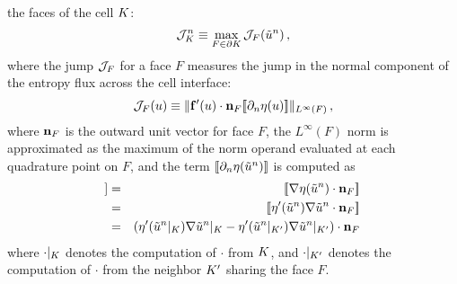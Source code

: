 the faces of the cell $K$:
\begin{equation}
  \mathcal{J}_K^n
  \equiv \max\limits_{F\in\partial K}\mathcal{J}_F(
    \tilde{u}^n) \,,
\end{equation}
where the jump $\mathcal{J}_F$ for a face $F$ measures the jump in the normal
component of the entropy flux across the cell interface:
\begin{equation}
  \mathcal{J}_F(u)
  \equiv \|\mathbf{f}'(u)
    \cdot\mathbf{n}_F
  [\![\partial_n \eta(u)
  ]\!]\|_{L^\infty(F)} \,,
\end{equation}
where $\mathbf{n}_F$ is the outward unit vector for face $F$, the
$L^\infty(F)$ norm is approximated as the maximum of the norm operand evaluated
at each quadrature point on $F$, and the term $[\![\partial_n \eta(
\tilde{u}^n)]\!]$ is computed as
\begin{eqnarray}
  [\![\partial_n \entropy(\approximatescalarsolution^\timeindex)]\!]
  & = & [\![\nabla\entropy(\approximatescalarsolution^\timeindex)
    \cdot\normalvector_F]\!]\\
  & = & [\![\entropy'(\approximatescalarsolution^\timeindex)
    \nabla\approximatescalarsolution^\timeindex\cdot\normalvector_F]\!]\\
  & = & (\entropy'(\approximatescalarsolution^\timeindex
    |_\cellindex)\nabla\approximatescalarsolution^\timeindex|_\cellindex
    - \entropy'(\approximatescalarsolution^\timeindex
    |_{\cellindex'})\nabla\approximatescalarsolution^\timeindex|_{\cellindex'})
    \cdot\normalvector_F
\end{eqnarray}
where $\cdot|_K$ denotes the computation of $\cdot$ from $K$,
and $\cdot|_{K'}$ denotes the computation of $\cdot$ from the neighbor
$K'$ sharing the face $F$.
